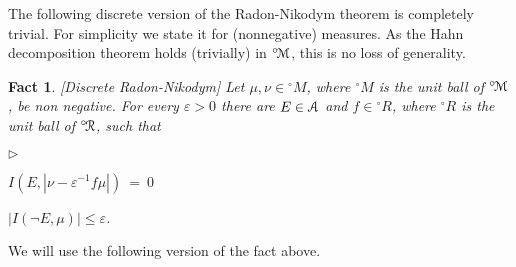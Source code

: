 \documentclass[12pt,letterpaper,oneside,reqno]{amsart}
\newcommand{\mylabel}[1]{{#1}\hfill}
\renewenvironment{itemize}
  {\begin{list}{$\triangleright$}{%
   \setlength{\parskip}{0mm}
   \setlength{\topsep}{.2\baselineskip}
   \setlength{\rightmargin}{0mm}
   \setlength{\listparindent}{0mm}
   \setlength{\itemindent}{0mm}
   \setlength{\labelwidth}{3ex}
   \setlength{\itemsep}{.2\baselineskip}
   \setlength{\parsep}{.2\baselineskip}
   \setlength{\partopsep}{0mm}
   \setlength{\labelsep}{1ex}
   \setlength{\leftmargin}{\labelwidth+\labelsep}
   \let\makelabel\mylabel}}{%
   \end{list}}
\theoremstyle{plain}
\newtheorem{fact}[theorem]{Fact}
\theoremstyle{remark}
\begin{document}
The following discrete version of the Radon-Nikodym theorem is completely trivial.
For simplicity we state it for (nonnegative) measures.
As the Hahn decomposition theorem holds (trivially) in ${}^{\circ\!}{\EuScript M}$, this is no loss of generality.

\begin{fact}\label{thm_fRN}
  [Discrete Radon-Nikodym]
  Let $\mu,\nu\in{}^{\circ\!\!}M$, where ${}^{\circ\!\!}M$ is the unit ball of ${}^{\circ\!}{\EuScript M}$, be non negative.
  For every $\varepsilon > 0$ there are $E\in{\EuScript A}$ and $f\in {}^{\circ\!\!}R$, where ${}^{\circ\!\!}R$ is the unit ball of ${}^{\circ\!}{\EuScript R}$, such that
  \begin{itemize}
    \item[1.] $I(E,|\nu-\varepsilon^{-1}f\mu|)\ =\ 0$
    \item[2.] $|I(\neg E, \mu)|\le\varepsilon$.
  \end{itemize}
\end{fact}

We will use the following version of the fact above.


\end{document}
